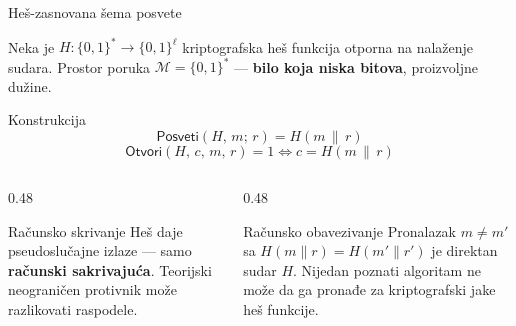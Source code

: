 \documentclass[aspectratio=1610]{beamer}
\newcommand{\keyword}[1]{\textcolor{wcprimary}{\textbf{#1}}}
\begin{document}
\begin{frame}{Heš-zasnovana šema posvete}

Neka je $H \colon \{0,1\}^* \to \{0,1\}^\ell$ kriptografska heš funkcija otporna na nalaženje sudara.
Prostor poruka $\mathcal{M} = \{0,1\}^*$ — \keyword{bilo koja niska bitova}, proizvoljne dužine.

\begin{block}{Konstrukcija}
  \[
    \mathsf{Posveti}(H,\, m;\, r) = H(m \,\|\, r)
  \]
  \[
    \mathsf{Otvori}(H,\, c,\, m,\, r) = 1 \iff c = H(m \,\|\, r)
  \]
\end{block}

\begin{columns}
  \begin{column}{0.48\textwidth}
    \begin{exampleblock}{Računsko skrivanje}
      Heš daje pseudoslučajne izlaze — samo \keyword{računski sakrivajuća}.
      Teorijski neograničen protivnik može razlikovati raspodele.
    \end{exampleblock}
  \end{column}
  \begin{column}{0.48\textwidth}
    \begin{alertblock}{Računsko obavezivanje}
      Pronalazak $m \neq m'$ sa $H(m\|r) = H(m'\|r')$ je direktan sudar $H$.
      Nijedan poznati algoritam ne može da ga pronađe za kriptografski
jake heš funkcije.
    \end{alertblock}
  \end{column}
\end{columns}
\end{frame}

\end{document}
